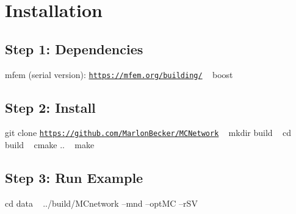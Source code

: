 \hypertarget{index_install_sec}{}\section{Installation}\label{index_install_sec}
\hypertarget{index_step1}{}\subsection{Step 1\+: Dependencies}\label{index_step1}
mfem (serial version)\+: \href{https://mfem.org/building/}{\tt https\+://mfem.\+org/building/} ~\newline
 boost ~\newline
\hypertarget{index_step2}{}\subsection{Step 2\+: Install}\label{index_step2}
git clone \href{https://github.com/MarlonBecker/MCNetwork}{\tt https\+://github.\+com/\+Marlon\+Becker/\+M\+C\+Network} ~\newline
 mkdir build ~\newline
 cd build ~\newline
 cmake .. ~\newline
 make ~\newline
\hypertarget{index_step3}{}\subsection{Step 3\+: Run Example}\label{index_step3}
cd data ~\newline
 ../build/\+M\+Cnetwork --mnd --opt\+MC --r\+SV ~\newline
 